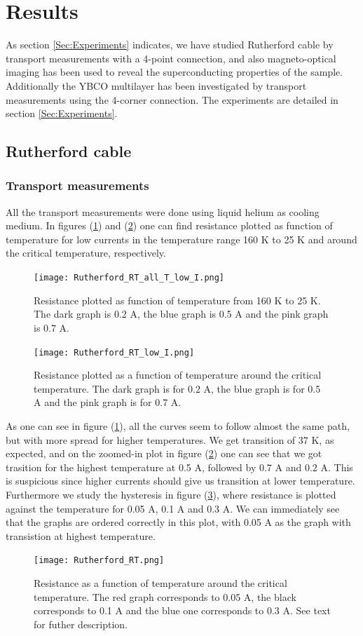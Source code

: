 \documentclass{comjnl}
\begin{document}
\section{Results}\label{Sec:Results}
As section \ref{Sec:Experiments} indicates, we have studied Rutherford cable by transport measurements with a 4-point connection, and also magneto-optical imaging has been used to reveal the superconducting properties of the sample. Additionally the YBCO multilayer has been investigated by transport measurements using the 4-corner connection. The experiments are detailed in section \ref{Sec:Experiments}.

\subsection{Rutherford cable}
\subsubsection{Transport measurements}
All the transport measurements were done using liquid helium as cooling medium. In figures (\ref{fig:rutherfordRTallI}) and (\ref{fig:rutherfordRTlowI}) one can find resistance plotted as function of temperature for low currents in the temperature range 160 K to 25 K and around the critical temperature, respectively. 
\begin{figure}[h]
\centering
\texttt{[image: Rutherford\_RT\_all\_T\_low\_I.png]}
\caption{Resistance plotted as function of temperature from 160 K to 25 K. The dark graph is 0.2 A, the blue graph is 0.5 A and the pink graph is 0.7 A. \label{fig:rutherfordRTallI}}
\end{figure}
\begin{figure}[h]
\centering
\texttt{[image: Rutherford\_RT\_low\_I.png]}
\caption{Resistance plotted as a function of temperature around the critical temperature. The dark graph is for 0.2 A, the blue graph is for 0.5 A and the pink graph is for 0.7 A. \label{fig:rutherfordRTlowI}}
\end{figure}
As one can see in figure (\ref{fig:rutherfordRTallI}), all the curves seem to follow almost the same path, but with more spread for higher temperatures. We get transition of 37 K, as expected, and on the zoomed-in plot in figure (\ref{fig:rutherfordRTlowI}) one can see that we got trasition for the highest temperature at 0.5 A, followed by 0.7 A and 0.2 A. This is suspicious since higher currents should give us transition at lower temperature. Furthermore we study the hysteresis in figure (\ref{fig:rutherfordRT}), where resistance is plotted against the temperature for 0.05 A, 0.1 A and 0.3 A. We can immediately see that the graphs are ordered correctly in this plot, with 0.05 A as the graph with transistion at highest temperature.
\begin{figure}[h]
\centering
\texttt{[image: Rutherford\_RT.png]}
\caption{Resistance as a function of temperature around the critical temperature. The red graph corresponds to 0.05 A, the black corresponds to 0.1 A and the blue one corresponds to 0.3 A. See text for futher description. \label{fig:rutherfordRT}}
\end{figure}
\end{document}
